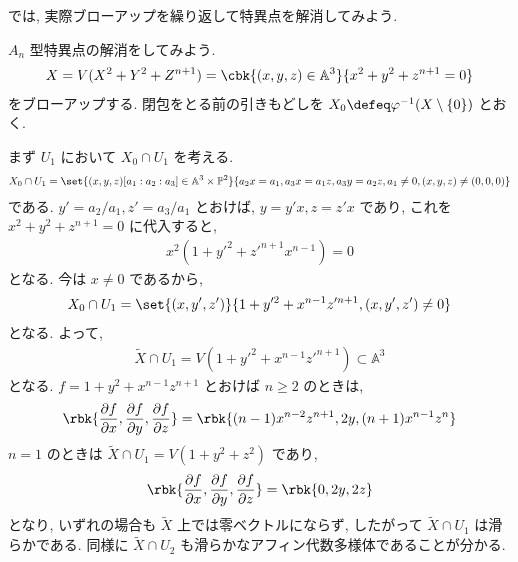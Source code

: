 \documentclass[openany, a4paper, oneside]{jsbook}
\begin{document}
では, 実際ブローアップを繰り返して特異点を解消してみよう.
\begin{ex}
$A_n$ 型特異点の解消をしてみよう.
\begin{align}
 X
 =
 V (X^2+Y^2+Z^{n+1})
 =
 \cbk{ (x,y,z) \in \mathbb{A}^3}{x^2+y^2+z^{n+1}=0}
\end{align}
をブローアップする.
閉包をとる前の引きもどしを $X_0 \defeq \varphi^{-1}(X \setminus \{0\})$ とおく.

まず $U_1$ において $X_0 \cap U_1$ を考える.
\begin{align}
 X_0 \cap U_1
 =
 \set{ (x,y,z) [a_1:a_2:a_3] \in \mathbb{A}^3 \times \mathbb{P}^2}{a_2x=a_1, a_3x=a_1z, a_3y=a_2z, a_1 \neq 0, (x,y,z) \neq (0,0,0)}
\end{align}
である.
$y'=a_2/a_1, z'=a_3/a_1$ とおけば, $y=y'x, z=z'x$ であり, これを $x^2+y^2+z^{n+1}=0$ に代入すると,
\begin{align}
 x^2 (1+ y'^2+z'^{n+1}x^{n-1})
 =
 0
\end{align}
となる.
今は $x \neq 0$ であるから,
\begin{align}
 X_0 \cap U_1
 =
 \set{(x,y',z')}{1+y'^2+x^{n-1}z'^{n+1}, (x,y',z') \neq 0}
\end{align}
となる.
よって,
\begin{align}
 \widetilde{X} \cap U_1
 =
 V (1+y'^2+x^{n-1}z'^{n+1}) \subset \mathbb{A}^3
\end{align}
となる.
$f=1+y^2+x^{n-1}z^{n+1}$ とおけば $n \geq 2$ のときは,
\begin{align}
 \rbk{\frac{\partial f}{\partial x}, \frac{\partial f}{\partial y}, \frac{\partial f}{\partial z}}
 =
 \rbk{(n-1) x^{n-2}z^{n+1}, 2y, (n+1) x^{n-1}z^n}
\end{align}
$n=1$ のときは $\widetilde{X} \cap U_1 = V (1+y^2+z^2)$ であり,
\begin{align}
 \rbk{\frac{\partial f}{\partial x}, \frac{\partial f}{\partial y}, \frac{\partial f}{\partial z}}
 =
 \rbk{0, 2y, 2z}
\end{align}
となり, いずれの場合も $\widetilde{X}$ 上では零ベクトルにならず,
したがって $\widetilde{X} \cap U_1$ は滑らかである.
同様に $\widetilde{X} \cap U_2$ も滑らかなアフィン代数多様体であることが分かる.


\end{ex}
\end{document}
